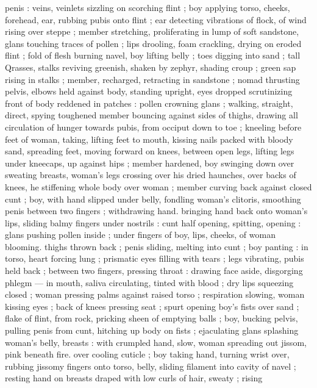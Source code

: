penis : veins, veinlets sizzling on scorching flint ; boy applying torso, 
cheeks, forehead, ear, rubbing pubis onto flint ; ear detecting 
vibrations of flock, of wind rising over steppe ; member stretching, 
proliferating in lump of soft sandstone, glans touching traces of 
pollen ; lips drooling, foam crackling, drying on eroded flint ; fold of 
flesh burning navel, boy lifting belly ; toes digging into sand ; tall 
Qrasses, stalks reviving greenish, shaken by zephyr, shading croup ; 
green sap rising in stalks ; member, recharged, retracting in 
sandstone ; nomad thrusting pelvis, elbows held against body, 
standing upright, eyes dropped scrutinizing front of body reddened 
in patches : pollen crowning glans ; walking, straight, direct, spying 
toughened member bouncing against sides of thighs, drawing all 
circulation of hunger towards pubis, from occiput down to toe ; 
kneeling before feet of woman, taking, lifting feet to mouth, kissing 
nails packed with bloody sand, spreading feet, moving forward on 
knees, between open legs, lifting legs under kneecaps, up against 
hips ; member hardened, boy swinging down over sweating breasts, 
woman's legs crossing over his dried haunches, over backs of knees, 
he stiffening whole body over woman ; member curving back against 
closed cunt ; boy, with hand slipped under belly, fondling woman's 
clitoris, smoothing penis between two fingers ; withdrawing hand. 
bringing hand back onto woman's lips, sliding balmy fingers under 
nostrils : cunt half opening, spitting, opening : glans pushing pollen 
inside ; under fingers of boy, lips, cheeks, of woman blooming. 
thighs thrown back ; penis sliding, melting into cunt ; boy panting : 
in torso, heart forcing lung ; prismatic eyes filling with tears ; legs 
vibrating, pubis held back ; between two fingers, pressing throat : 
drawing face aside, disgorging phlegm --- in mouth, saliva 
circulating, tinted with blood ; dry lips squeezing closed ; woman 
pressing palms against raised torso ; respiration slowing, woman 
kissing eyes ; back of knees pressing seat ; spurt opening boy's fists 
over sand ; flake of flint, from rock, pricking sheen of emptying balls 
; boy, bucking pelvis, pulling penis from cunt, hitching up body on 
fists ; ejaculating glans splashing woman's belly, breasts : with 
crumpled hand, slow, woman spreading out jissom, pink beneath fire. 
over cooling cuticle ; boy taking hand, turning wrist over, rubbing 
jissomy fingers onto torso, belly, sliding filament into cavity of navel 
; resting hand on breasts draped with low curls of hair, sweaty ; rising 
